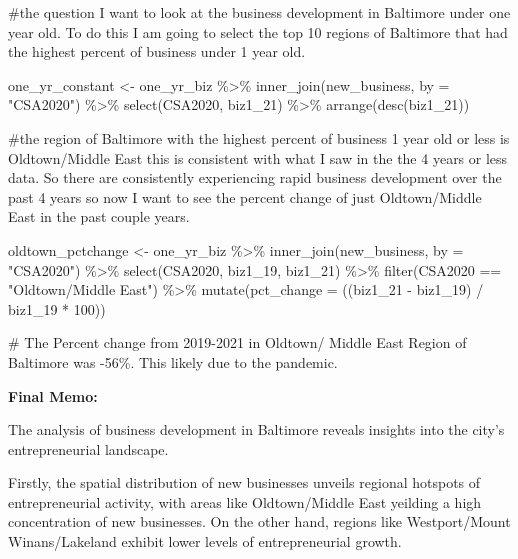 \documentclass[
  letterpaper,
  DIV=11,
  numbers=noendperiod]{scrartcl}
\newenvironment{Shaded}{\begin{snugshade}}{\end{snugshade}}
\newcommand{\AttributeTok}[1]{\textcolor[rgb]{0.40,0.45,0.13}{#1}}
\newcommand{\CommentTok}[1]{\textcolor[rgb]{0.37,0.37,0.37}{#1}}
\newcommand{\DecValTok}[1]{\textcolor[rgb]{0.68,0.00,0.00}{#1}}
\newcommand{\FunctionTok}[1]{\textcolor[rgb]{0.28,0.35,0.67}{#1}}
\newcommand{\NormalTok}[1]{\textcolor[rgb]{0.00,0.23,0.31}{#1}}
\newcommand{\OtherTok}[1]{\textcolor[rgb]{0.00,0.23,0.31}{#1}}
\newcommand{\SpecialCharTok}[1]{\textcolor[rgb]{0.37,0.37,0.37}{#1}}
\newcommand{\StringTok}[1]{\textcolor[rgb]{0.13,0.47,0.30}{#1}}
\begin{document}
\begin{Shaded}
\begin{Highlighting}[]
\CommentTok{\#the question I want to look at the business development in Baltimore under one year old. To do this I am going to select the top 10 regions of Baltimore that had the highest percent of business under 1 year old.}

\NormalTok{one\_yr\_constant }\OtherTok{\textless{}{-}}\NormalTok{ one\_yr\_biz }\SpecialCharTok{\%\textgreater{}\%}
  \FunctionTok{inner\_join}\NormalTok{(new\_business, }\AttributeTok{by =} \StringTok{"CSA2020"}\NormalTok{) }\SpecialCharTok{\%\textgreater{}\%}
\FunctionTok{select}\NormalTok{(CSA2020, biz1\_21) }\SpecialCharTok{\%\textgreater{}\%}
\FunctionTok{arrange}\NormalTok{(}\FunctionTok{desc}\NormalTok{(biz1\_21))}

\CommentTok{\#the region of Baltimore with the highest percent of business 1 year old or less is  Oldtown/Middle East this is consistent with what I saw in the the 4 years or less data. So there are consistently experiencing rapid business development over the past 4 years so now I want to see the percent change of just Oldtown/Middle East in the past couple years. }

\NormalTok{oldtown\_pctchange }\OtherTok{\textless{}{-}}\NormalTok{ one\_yr\_biz }\SpecialCharTok{\%\textgreater{}\%}
\FunctionTok{inner\_join}\NormalTok{(new\_business, }\AttributeTok{by =} \StringTok{"CSA2020"}\NormalTok{) }\SpecialCharTok{\%\textgreater{}\%}
  \FunctionTok{select}\NormalTok{(CSA2020, biz1\_19, biz1\_21) }\SpecialCharTok{\%\textgreater{}\%}
  \FunctionTok{filter}\NormalTok{(CSA2020 }\SpecialCharTok{==} \StringTok{"Oldtown/Middle East"}\NormalTok{) }\SpecialCharTok{\%\textgreater{}\%}
\FunctionTok{mutate}\NormalTok{(}\AttributeTok{pct\_change =}\NormalTok{ ((biz1\_21 }\SpecialCharTok{{-}}\NormalTok{ biz1\_19) }\SpecialCharTok{/}\NormalTok{ biz1\_19 }\SpecialCharTok{*} \DecValTok{100}\NormalTok{))}

\CommentTok{\# The Percent change from 2019{-}2021 in Oldtown/ Middle East Region of Baltimore was {-}56\%. This likely due to the pandemic. }
\end{Highlighting}
\end{Shaded}

\textbf{Final Memo:}

The analysis of business development in Baltimore reveals insights into
the city's entrepreneurial landscape.

Firstly, the spatial distribution of new businesses unveils regional
hotspots of entrepreneurial activity, with areas like Oldtown/Middle
East yeilding a high concentration of new businesses. On the other hand,
regions like Westport/Mount Winans/Lakeland exhibit lower levels of
entrepreneurial growth.
\end{document}
